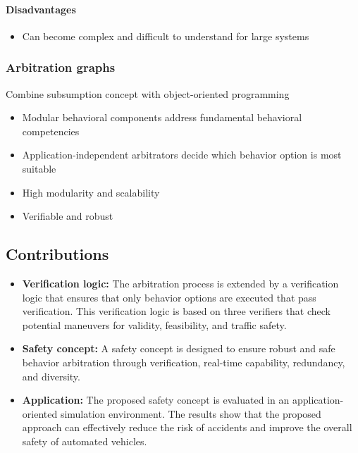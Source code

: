 \paragraph*{Disadvantages}
\begin{itemize}
    \item Can become complex and difficult to understand for large systems
\end{itemize}

\subsubsection*{Arbitration graphs}
Combine subsumption concept with object-oriented programming \cite{lauer_cognitive_2010}
\begin{itemize}
    \item Modular behavioral components address fundamental behavioral competencies
    \item Application-independent arbitrators decide which behavior option is most suitable
    \item High modularity and scalability
    \item Verifiable and robust
\end{itemize}

\subsection{Contributions}

\begin{itemize}
    \item \textbf{Verification logic:} The arbitration process is extended by a verification logic that ensures that only behavior options are executed that pass verification. This verification logic is based on three verifiers that check potential maneuvers for validity, feasibility, and traffic safety.
    \item \textbf{Safety concept:} A safety concept is designed to ensure robust and safe behavior arbitration through verification, real-time capability, redundancy, and diversity.
    \item \textbf{Application:} The proposed safety concept is evaluated in an application-oriented simulation environment. The results show that the proposed approach can effectively reduce the risk of accidents and improve the overall safety of automated vehicles.
\end{itemize}
